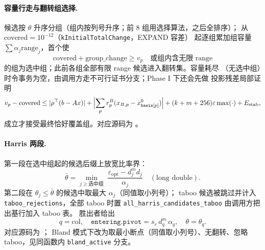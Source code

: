 \paragraph{容量行走与翻转组选择.}
候选按 $\theta$ 升序分组（组内按列号升序；前 8 组用选择算法，之后全排序）；
从 $\mathrm{covered} = 10^{-12}$（\texttt{kInitialTotalChange}，EXPAND 容差）
起逐组累加组容量 $\sum \alpha_j \mathrm{range}_j$，首个使
\begin{equation}
  \mathrm{covered} + \mathrm{group\_change} \ge v_p
  \quad\text{或组内含无限 range}
  \label{eq:lpkernel:capacity-walk}
\end{equation}
的组为选中组；此前各组全部有限 range 候选进入翻转集。容量耗尽
（无选中组）时令事务为空，由调用方走不可行证书分支；Phase I 下还会先做
投影残差局部证明
\begin{equation}
  v_p - \mathrm{covered} \le |\rho^{\top}(b - Ax)| +
  \Bigl|\sum_p r^{B}_p (x_{B,p} - x^{0}_{\texttt{basis}[p]})\Bigr|
  + (k + m + 256)\varepsilon\max(\cdot) + E_{\text{stab}},
\end{equation}
成立才接受最终恰好覆盖组。对应源码为
。

\paragraph{Harris 两段.}
第一段在选中组起的候选后缀上放宽比率界：
\begin{equation}
  \bar\theta = \min_{j \ge \text{选中组}}\;
  \frac{\varepsilon_{\text{opt}} - d^{m}_j d_j}{\alpha_j}
  \quad(\text{long double}).
  \label{eq:lpkernel:harris1}
\end{equation}
第二段在 $\theta_j \le \bar\theta$ 的候选中取最大 $\alpha_j$（同值取小列号）；
taboo 候选被跳过并计入 \texttt{taboo\_rejections}，全部 taboo 时置
\texttt{all\_harris\_candidates\_taboo} 由调用方把出基行加入 taboo 表。
胜出者给出
\begin{equation}
  q = \mathrm{col},\quad
  \texttt{entering.pivot} = s_r\, d^{m}_q\, \alpha_q,\quad
  \theta = \theta_q .
  \label{eq:lpkernel:harris2}
\end{equation}
对应源码为 ；
Bland 模式下改为取最小断点（同值取小列号）、无翻转、忽略 taboo，见同函数内
\texttt{bland\_active} 分支。

